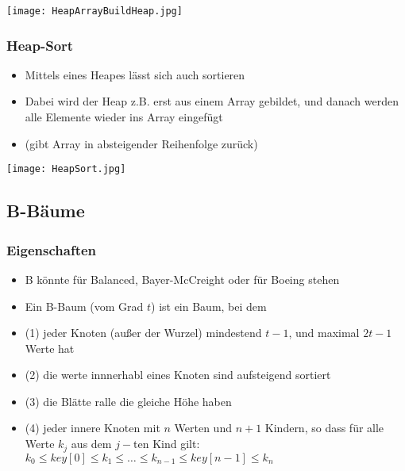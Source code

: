 			\begin{center}
				\texttt{[image: HeapArrayBuildHeap.jpg]}
			\end{center}

		
		\subsubsection{Heap-Sort}
			\begin{minipage}{0.5\textwidth}
				\begin{itemize}
					\item Mittels eines Heapes lässt sich auch sortieren
					\item Dabei wird der Heap z.B. erst aus einem Array gebildet, und danach
						werden alle Elemente wieder ins Array eingefügt
					\item (gibt Array in absteigender Reihenfolge zurück)
				\end{itemize}
			\end{minipage}
			\hspace{0.8cm}
			\begin{minipage}{0.45\textwidth}
				\begin{center}
					\texttt{[image: HeapSort.jpg]}
				\end{center}
			\end{minipage}


	\newpage
	\subsection{B-Bäume}
		\subsubsection{Eigenschaften}
			\begin{itemize}
				\item B könnte für Balanced, Bayer-McCreight oder für Boeing stehen
				\item Ein B-Baum (vom Grad $t$) ist ein Baum, bei dem
				\item (1) jeder Knoten (au\ss er der Wurzel) mindestend $t - 1$, und maximal $2t - 1$
					Werte hat
				\item (2) die werte innnerhabl eines Knoten sind aufsteigend sortiert
				\item (3) die Blätte ralle die gleiche Höhe haben
				\item (4) jeder innere Knoten mit $n$ Werten und $n + 1$ Kindern, so dass für alle
					Werte $k_j$ aus dem $j-$ten Kind gilt: $k_0 \leq key[0] \leq k_1 \leq \dots \leq k_{n-1} \leq key[n-1] \leq k_n$
			\end{itemize}


